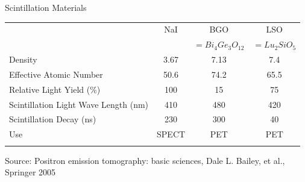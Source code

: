 
\begin{frame}[c]{Scintillation Materials}
    \begin{table}[ht]
        \begin{tabular}{l  c  c  c }
            \toprule{}                                                & NaI   & BGO               & LSO          \\
                                                                      &       & $=Bi_4Ge_3O_{12}$ & $=Lu_2SiO_5$ \\
            \midrule{}Density                                         & 3.67  & 7.13              & 7.4          \\
            \rowcolor{faublue!10}Effective Atomic Number              & 50.6  & 74.2              & 65.5         \\
            Relative Light Yield (\%)                                 & 100   & 15                & 75           \\
            \rowcolor{faublue!10}Scintillation Light Wave Length (nm) & 410   & 480               & 420          \\
            Scintillation Decay (ns)                                  & 230   & 300               & 40           \\
            \rowcolor{faublue!10}Use                                  & SPECT & PET               & PET          \\
            \bottomrule{}                                                                                        \\
        \end{tabular}
    \end{table}
    {\scriptsize Source: Positron emission tomography: basic sciences, Dale L. Bailey, et al., Springer 2005}
\end{frame}

